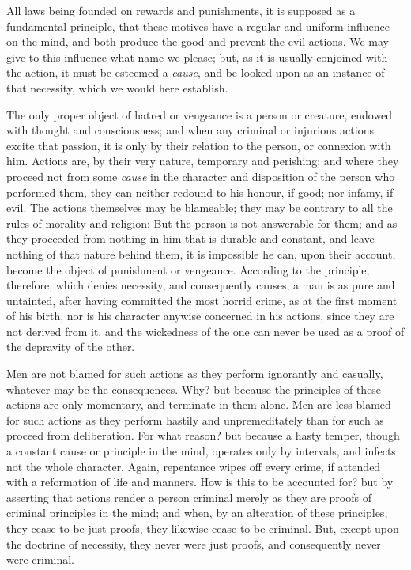 \documentclass[]{article}
\begin{document}
\begin{sectionbody}
\humeparagraph  All laws being founded on rewards and punishments, it is supposed as a fundamental principle, that these motives have a regular and uniform influence on the mind, and both produce the good and prevent the evil actions. We may give to this influence what name we please; but, as it is usually conjoined with the action, it must be esteemed a \emph{cause}, and be looked upon as an instance of that necessity, which we would here establish.

\humeparagraph  The only proper object of hatred or vengeance is a person or creature, endowed with thought and consciousness; and when any criminal or injurious actions excite that passion, it is only by their relation to the person, or connexion with him. Actions are, by their very nature, temporary and perishing; and where they proceed not from some \emph{cause} in the character and disposition of the person who performed them, they can neither redound to his honour, if good; nor infamy, if evil. The actions themselves may be blameable; they may be contrary to all the rules of morality and religion: But the person is not answerable for them; and as they proceeded from nothing in him that is durable and constant, and leave nothing of that nature behind them, it is impossible he can, upon their account, become the object of punishment or vengeance. According to the principle, therefore, which denies necessity, and consequently causes, a man is as pure and untainted, after having committed the most horrid crime, as at the first moment of his birth, nor is his character anywise concerned in his actions, since they are not derived from it, and the wickedness of the one can never be used as a proof of the depravity of the other.

\humeparagraph  Men are not blamed for such actions as they perform ignorantly and casually, whatever may be the consequences. Why? but because the principles of these actions are only momentary, and terminate in them alone. Men are less blamed for such actions as they perform hastily and unpremeditately than for such as proceed from deliberation. For what reason? but because a hasty temper, though a constant cause or principle in the mind, operates only by intervals, and infects not the whole character. Again, repentance wipes off every crime, if attended with a reformation of life and manners. How is this to be accounted for? but by asserting that actions render a person criminal merely as they are proofs of criminal principles in the mind; and when, by an alteration of these principles, they cease to be just proofs, they likewise cease to be criminal. But, except upon the doctrine of necessity, they never were just proofs, and consequently never were criminal.


\end{sectionbody}
\end{document}
